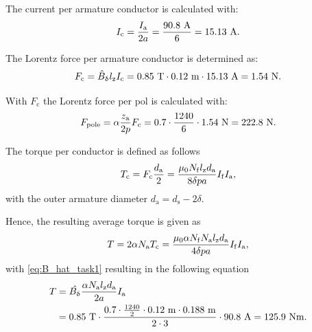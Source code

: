 \begin{solutionblock}
	The current per armature conductor is calculated with:
	\begin{equation}
		I_{\mathrm{c}} = \frac{\Ia}{2a}
		= \frac{90.8 \ \si{A}}{6}
		= 15.13 \ \si{A}.
	\end{equation}

	The Lorentz force per armature conductor is determined as:
	\begin{equation}
		F_{\mathrm{c}} = \hat{B}_{\updelta} \lz I_{\mathrm{c}}
		= 0.85 \ \si{T} \cdot 0.12 \ \si{m} \cdot 15.13 \ \si{A}
		= 1.54 \ \si{N}.
	\end{equation}

	With $F_{\mathrm{c}}$ the Lorentz force per pol is calculated with:
	\begin{equation}
		F_{\mathrm{pole}} = \alpha \frac{\za}{2p} F_{\mathrm{c}}
		= 0.7 \cdot \frac{1240}{6} \cdot 1.54 \ \si{N}
		= 222.8 \ \si{N}.
	\end{equation}

	The torque per conductor is defined as follows
	\begin{equation}
		T_{\mathrm{c}} = F_{\mathrm{c}} \frac{d_{\mathrm{a}}}{2}
		= \frac{\mu_{\mathrm{0}} N_{\mathrm{f}} \lz d_{\mathrm{a}}}{8\delta p a} I_{\mathrm{f}}I_{\mathrm{a}},
	\end{equation}
	with the outer armature diameter $d_{\mathrm{a}} = d_{\mathrm{s}} - 2\delta$.

	Hence, the resulting average torque is given as
	\begin{equation}
		T = 2 \alpha N_{\mathrm{a}} T_{\mathrm{c}}
		= \frac{\mu_{\mathrm{0}} \alpha N_{\mathrm{f}} N_{\mathrm{a}} \lz d_{\mathrm{a}}}{4 \delta p a} I_{\mathrm{f}} I_{\mathrm{a}},
	\end{equation}
	with \eqref{eq:B_hat_task1} resulting in the following equation
	\begin{align}
		\begin{split}
			T & = \hat{B_{\updelta}} \frac{\alpha N_{\mathrm{a}} \lz d_{\mathrm{a}}}{2a} \Ia                                                  \\
			  & = 0.85 \ \si{T} \cdot \frac{0.7 \cdot \frac{1240}{2} \cdot 0.12 \ \si{m} \cdot 0.188 \ \si{m}}{2 \cdot 3} \cdot 90.8 \ \si{A}
			= 125.9 \ \si{Nm}.
		\end{split}
	\end{align}

\end{solutionblock}


